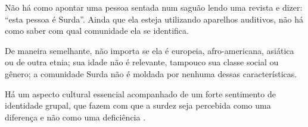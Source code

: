 \begin{citacao}
    Não há como apontar uma pessoa sentada num saguão lendo uma revista e dizer: ``esta pessoa é Surda''. Ainda que ela esteja utilizando aparelhos auditivos, não há como saber com qual comunidade ela se identifica.

    De maneira semelhante, não importa se ela é europeia, afro-americana, asiática ou de outra etnia; sua idade não é relevante, tampouco sua classe social ou gênero; a comunidade Surda não é moldada por nenhuma dessas características.~\cite[tradução nossa]{stewart-2021-barrons-asl}

\end{citacao}


Há um aspecto cultural essencial acompanhado de um forte sentimento de identidade grupal, que fazem com que a surdez seja percebida como uma diferença e não como uma deficiência \cite{pereira-2011-conhecimento-alem-sinais}.






